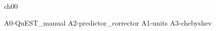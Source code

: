 \documentclass[mixedtoc]{msu-thesis-custom}
\begin{document}
{ch00}

%
%

\begin{appendices}
  {A0-QuEST_manual}
  {A2-predictor_corrector}
  {A1-units}
  {A3-chebyshev}
\end{appendices}

\backmatter
%
%
\makebibliographypage %
%
\SingleSpacing

{}


%
\end{document}
